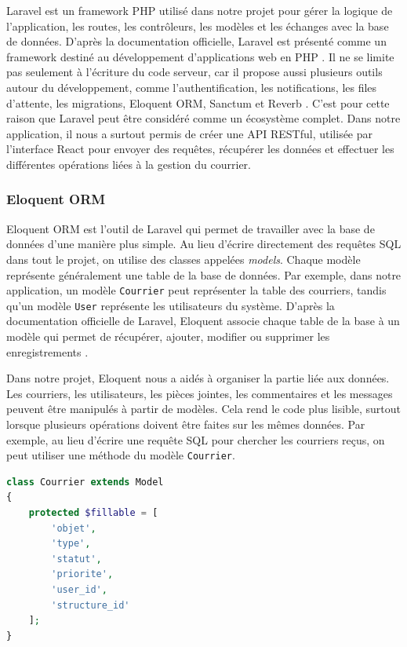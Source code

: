 Laravel est un framework PHP utilisé dans notre projet pour gérer la logique de l’application, les routes, les contrôleurs, les modèles et les échanges avec la base de données. D’après la documentation officielle, Laravel est présenté comme un framework destiné au développement d’applications web en PHP \cite{laravel}. Il ne se limite pas seulement à l’écriture du code serveur, car il propose aussi plusieurs outils autour du développement, comme l’authentification, les notifications, les files d’attente, les migrations, Eloquent ORM, Sanctum et Reverb \cite{laraveldocs}. C’est pour cette raison que Laravel peut être considéré comme un écosystème complet. Dans notre application, il nous a surtout permis de créer une API RESTful, utilisée par l’interface React pour envoyer des requêtes, récupérer les données et effectuer les différentes opérations liées à la gestion du courrier.
\subsubsection{Eloquent ORM}
\label{subsubsec:eloquent_orm}

Eloquent ORM est l’outil de Laravel qui permet de travailler avec la base de données d’une manière plus simple. Au lieu d’écrire directement des requêtes SQL dans tout le projet, on utilise des classes appelées \textit{models}. Chaque modèle représente généralement une table de la base de données. Par exemple, dans notre application, un modèle \texttt{Courrier} peut représenter la table des courriers, tandis qu’un modèle \texttt{User} représente les utilisateurs du système. D’après la documentation officielle de Laravel, Eloquent associe chaque table de la base à un modèle qui permet de récupérer, ajouter, modifier ou supprimer les enregistrements \cite{laravel_eloquent}.

Dans notre projet, Eloquent nous a aidés à organiser la partie liée aux données. Les courriers, les utilisateurs, les pièces jointes, les commentaires et les messages peuvent être manipulés à partir de modèles. Cela rend le code plus lisible, surtout lorsque plusieurs opérations doivent être faites sur les mêmes données. Par exemple, au lieu d’écrire une requête SQL pour chercher les courriers reçus, on peut utiliser une méthode du modèle \texttt{Courrier}.

\begin{lstlisting}[language=PHP, caption={Exemple simple de modèle Eloquent}]
class Courrier extends Model
{
    protected $fillable = [
        'objet',
        'type',
        'statut',
        'priorite',
        'user_id',
        'structure_id'
    ];
}
\end{lstlisting}

